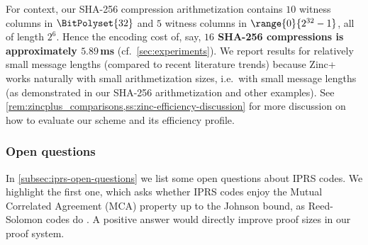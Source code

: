 For context, our SHA-256 compression arithmetization contains $10$ witness columns in $\BitPolyset{32}$ and $5$ witness columns in $\range{0}{2^{32}-1}$, all of length $2^6$. Hence the encoding cost of, say, \textbf{$16$ SHA-256 compressions is approximately $5.89$\,ms} (cf.\ \cref{sec:experiments}).  We report results for relatively small message lengths (compared to recent literature trends) because Zinc+ works naturally with small arithmetization sizes, i.e.\ with small message lengths (as demonstrated in our SHA-256 arithmetization and other examples). See \cref{rem:zincplus_comparisons,ss:zinc-efficiency-discussion} for more discussion on how to evaluate our scheme and its efficiency profile.

\subsubsection{Open questions}

In \cref{subsec:iprs-open-questions} we list some open questions about IPRS codes. We highlight the first one, which asks whether IPRS codes enjoy the Mutual Correlated Agreement (MCA) property up to the Johnson bound, as Reed-Solomon codes do \cite{HaboeckMCA, BCGM25}. A positive answer would directly improve proof sizes  in our proof system.



